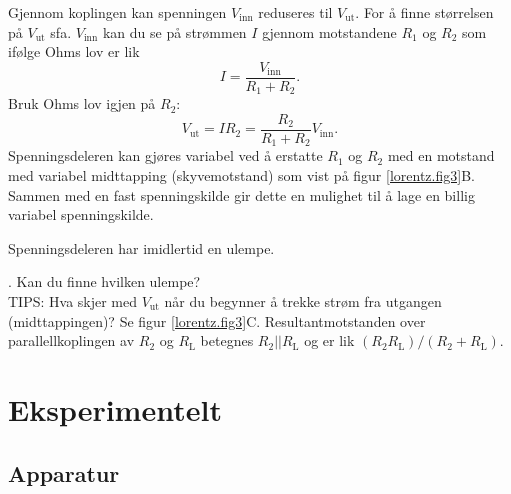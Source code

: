 \documentclass[../Elmag-labhefte-2020.tex]{subfiles}
\begin{document}
%
Gjennom koplingen kan spenningen $V_\mathrm{inn}$ reduseres til $V_\mathrm{ut}$. For å finne størrelsen på $V_\mathrm{ut}$ sfa. $V_\mathrm{inn}$ kan du se på strømmen $I$ gjennom motstandene $R_1$ og $R_2$ som ifølge Ohms lov er lik
\begin{equation}
    I = \frac{V_\mathrm{inn}}{R_1 + R_2} .
\end{equation}
Bruk Ohms lov igjen på $R_2$:
\begin{equation}
    V_\mathrm{ut} 
        = I  R_2 
        = \frac{R_2}{R_1 + R_2} V_\mathrm{inn}.
\end{equation}
Spenningsdeleren kan gjøres variabel ved å erstatte $R_1$ og $R_2$ med en motstand med variabel midttapping (skyvemotstand) som vist på figur \ref{lorentz.fig3}B. Sammen med en fast spenningskilde gir dette en mulighet til å lage en billig variabel spenningskilde. 

Spenningsdeleren har imidlertid en ulempe. 

{. Kan du finne hvilken ulempe? }
\\
TIPS: Hva  skjer med $V_\mathrm{ut}$ når du begynner å trekke strøm fra utgangen (midttappingen)? Se figur \ref{lorentz.fig3}C. Resultantmotstanden over parallellkoplingen av $R_2$ og $R_\mathrm{L}$ betegnes $R_2||R_\mathrm{L}$ og er lik $ (R_2R_\mathrm{L})/(R_2 + R_\mathrm{L})$.



\section{Eksperimentelt \label{ch.lorentz.eksp} }

\subsection{Apparatur}
\end{document}
